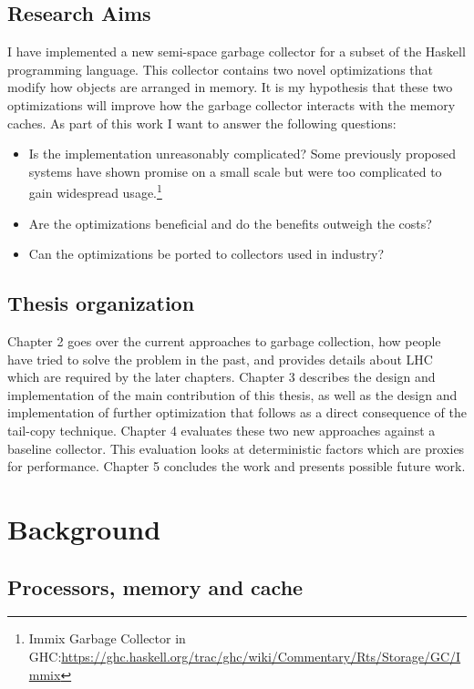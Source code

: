 \documentclass[a4paper,oneside]{memoir}
\begin{document}
\section{Research Aims}
I have implemented a new semi-space garbage collector for a subset of the
Haskell programming language. This collector contains two novel optimizations
that modify how objects are arranged in memory. It is my hypothesis that these
two optimizations will improve how the garbage collector interacts with the
memory caches. As part of this work I want to answer the following questions:
\begin{itemize}
  \item Is the implementation unreasonably complicated? Some previously proposed
    systems have shown promise on a small scale but were too complicated to
    gain widespread usage.\footnote{Immix Garbage Collector in GHC:\url{https://ghc.haskell.org/trac/ghc/wiki/Commentary/Rts/Storage/GC/Immix}}
  \item Are the optimizations beneficial and do the benefits outweigh the costs?
  \item Can the optimizations be ported to collectors used in industry?
\end{itemize}

\section{Thesis organization}
Chapter 2 goes over the current approaches to garbage collection, how people
have tried to solve the problem in the past, and provides details about
LHC which are required by the later chapters.
Chapter 3 describes the design and implementation of the main contribution of
this thesis, as well as the design and implementation of further optimization
that follows as a direct consequence of the tail-copy technique.
Chapter 4 evaluates these two new approaches against a baseline collector. This
evaluation looks at deterministic factors which are proxies for performance.
Chapter 5 concludes the work and presents possible future work.

\chapter{Background}
\label{background}

\section{Processors, memory and cache}
\end{document}
